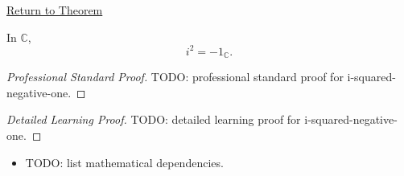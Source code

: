 \newpage
{}
\label{prf:i-squared-negative-one}

\begin{remark*}[Return]
\hyperref[thm:i-squared-negative-one]{Return to Theorem}
\end{remark*}

\begin{theorem*}
In \(\mathbb{C}\),
\[
i^2=-1_{\mathbb{C}}.
\]
\end{theorem*}

\begin{proof}[Professional Standard Proof]
\LRAProofBodyStart
TODO: professional standard proof for i-squared-negative-one.
\end{proof}

\begin{proof}[Detailed Learning Proof]
\LRAProofBodyStart
TODO: detailed learning proof for i-squared-negative-one.
\end{proof}

\begin{remark*}
\end{remark*}

\begin{dependencies}
\begin{itemize}
  \item TODO: list mathematical dependencies.
\end{itemize}
\end{dependencies}

\clearpage
